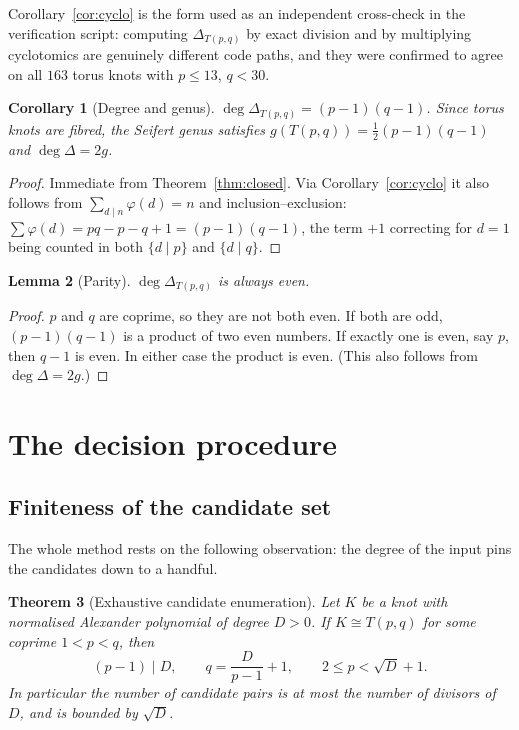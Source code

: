 \documentclass[11pt]{article}
\newtheorem{theorem}{Theorem}
\newtheorem{lemma}[theorem]{Lemma}
\newtheorem{corollary}[theorem]{Corollary}
\theoremstyle{definition}
\newcommand{\Deltaa}{\Delta}
\newcommand{\T}[2]{T(#1,#2)}
\begin{document}
Corollary~\ref{cor:cyclo} is the form used as an independent cross-check in the
verification script: computing $\Deltaa_{\T{p}{q}}$ by exact division and by
multiplying cyclotomics are genuinely different code paths, and they were confirmed
to agree on all $163$ torus knots with $p\le 13$, $q<30$.

\begin{corollary}[Degree and genus]\label{cor:deg}
$\deg \Deltaa_{\T{p}{q}} = (p-1)(q-1)$. Since torus knots are fibred, the Seifert
genus satisfies $g(\T{p}{q}) = \tfrac{1}{2}(p-1)(q-1)$ and $\deg\Deltaa = 2g$.
\end{corollary}

\begin{proof}
Immediate from Theorem~\ref{thm:closed}. Via Corollary~\ref{cor:cyclo} it also follows
from $\sum_{d\mid n}\varphi(d)=n$ and inclusion--exclusion:
$\sum \varphi(d) = pq - p - q + 1 = (p-1)(q-1)$, the term $+1$ correcting for
$d=1$ being counted in both $\{d\mid p\}$ and $\{d\mid q\}$.
\end{proof}

\begin{lemma}[Parity]\label{lem:parity}
$\deg \Deltaa_{\T{p}{q}}$ is always even.
\end{lemma}

\begin{proof}
$p$ and $q$ are coprime, so they are not both even. If both are odd, $(p-1)(q-1)$ is a
product of two even numbers. If exactly one is even, say $p$, then $q-1$ is even. In
either case the product is even. (This also follows from $\deg\Deltaa = 2g$.)
\end{proof}

\section{The decision procedure}

\subsection{Finiteness of the candidate set}

The whole method rests on the following observation: the degree of the input pins the
candidates down to a handful.

\begin{theorem}[Exhaustive candidate enumeration]\label{thm:finite}
Let $K$ be a knot with normalised Alexander polynomial of degree $D>0$. If
$K \cong \T{p}{q}$ for some coprime $1<p<q$, then
\[
(p-1) \mid D,
\qquad
q = \frac{D}{p-1}+1,
\qquad
2 \le p < \sqrt{D}+1 .
\]
In particular the number of candidate pairs is at most the number of divisors of $D$,
and is bounded by $\sqrt{D}$.
\end{theorem}
\end{document}
